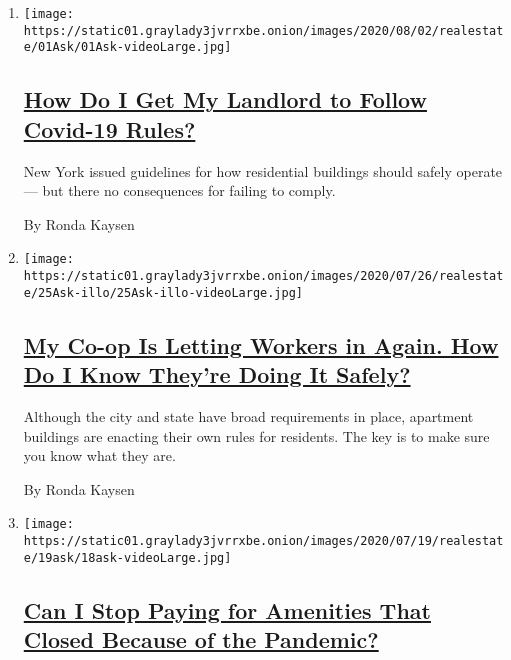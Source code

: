 \begin{enumerate}
\def\labelenumi{\arabic{enumi}.}
\item
  \texttt{[image: https://static01.graylady3jvrrxbe.onion/images/2020/08/02/realestate/01Ask/01Ask-videoLarge.jpg]}

  \hypertarget{how-do-i-get-my-landlord-to-follow-covid-19-rules}{%
  \subsection{\texorpdfstring{\href{/2020/08/01/realestate/coronavirus-covid-apartment-buildings.html}{How
  Do I Get My Landlord to Follow Covid-19
  Rules?}}{How Do I Get My Landlord to Follow Covid-19 Rules?}}\label{how-do-i-get-my-landlord-to-follow-covid-19-rules}}

  New York issued guidelines for how residential buildings should safely
  operate --- but there no consequences for failing to comply.

  By Ronda Kaysen
\item
  \texttt{[image: https://static01.graylady3jvrrxbe.onion/images/2020/07/26/realestate/25Ask-illo/25Ask-illo-videoLarge.jpg]}

  \hypertarget{my-co-op-is-letting-workers-in-again-how-do-i-know-theyre-doing-it-safely}{%
  \subsection{\texorpdfstring{\href{/2020/07/25/realestate/coronavirus-reopening-workers-in-buildings-rules.html}{My
  Co-op Is Letting Workers in Again. How Do I Know They're Doing It
  Safely?}}{My Co-op Is Letting Workers in Again. How Do I Know They're Doing It Safely?}}\label{my-co-op-is-letting-workers-in-again-how-do-i-know-theyre-doing-it-safely}}

  Although the city and state have broad requirements in place,
  apartment buildings are enacting their own rules for residents. The
  key is to make sure you know what they are.

  By Ronda Kaysen
\item
  \texttt{[image: https://static01.graylady3jvrrxbe.onion/images/2020/07/19/realestate/19ask/18ask-videoLarge.jpg]}

  \hypertarget{can-i-stop-paying-for-amenities-that-closed-because-of-the-pandemic}{%
  \subsection{\texorpdfstring{\href{/2020/07/18/realestate/gym-playroom-fees-coronavirus.html}{Can
  I Stop Paying for Amenities That Closed Because of the
  Pandemic?}}{Can I Stop Paying for Amenities That Closed Because of the Pandemic?}}\label{can-i-stop-paying-for-amenities-that-closed-because-of-the-pandemic}}


\end{enumerate}
